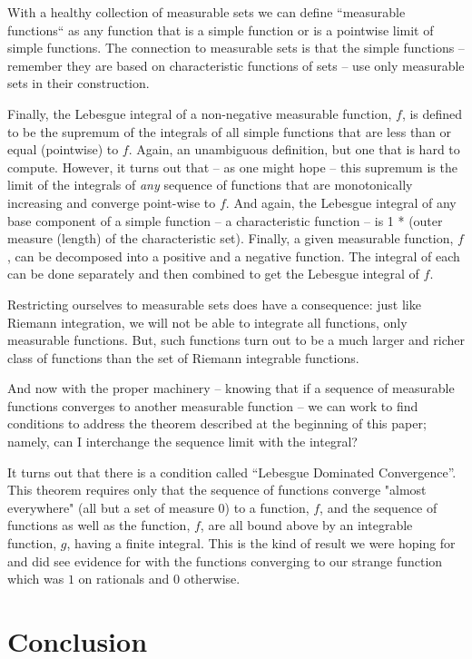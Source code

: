 \documentclass{article}
\begin{document}
With a healthy collection of measurable sets we can define ``measurable functions``
as any function that is a simple function or is a pointwise limit of simple functions.
The connection to measurable sets is that the simple functions -- remember they 
are based on characteristic functions of sets -- use only measurable sets in 
their construction.

Finally, the Lebesgue integral of a non-negative measurable function, $f$, is defined to be 
the supremum of the integrals of
all simple functions that are less than or equal (pointwise) to $f$. 
Again, an unambiguous definition, but one that is hard to compute. 
However, it turns out that -- as one might hope --
this supremum is the limit of the integrals of {\em any\/} sequence of 
functions that are monotonically increasing and converge point-wise to $f$.
And again, the Lebesgue
integral of any base component of a simple function -- a characteristic function --
is 1 * (outer measure (length) of the characteristic set).
Finally, a given measurable function, $f$, can be decomposed into a positive and
a negative function. The integral of each can be done separately and then combined
to get the Lebesgue integral of $f$.

Restricting ourselves to measurable sets does have a consequence: just like 
Riemann integration, we will not be able to integrate all functions, only 
measurable functions. But, such functions turn out to be a 
much larger and richer class of functions than the set of Riemann integrable functions.

And now with the proper machinery -- knowing that if a sequence of measurable functions
converges to another measurable function -- we can work to find conditions
to address the theorem described at the beginning of this paper; namely, 
can I interchange the sequence limit with the integral?

It turns out that there is a condition called ``Lebesgue Dominated Convergence''.
This theorem requires only that the sequence of functions converge "almost everywhere"
(all but a set of measure $0$) to a function, $f$, and the sequence of functions 
as well as the function, $f$,
are all bound above by an integrable function, $g$, having a finite integral.
This is the kind of result we were hoping for and did see evidence for with 
the functions converging to our strange function which was $1$ on rationals
and $0$ otherwise.


\section{Conclusion}
\end{document}
